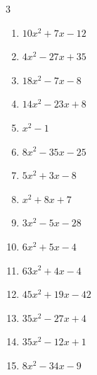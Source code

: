 \begin{multicols}{3}
\begin{enumerate}
  \item $10x^{2}+7x-12$

        \phantom{$=(5x-4)(2x+3)$}

  \item $4x^{2}-27x+35$

        \phantom{$=(4x-7)(x-5)$}

  \item $18x^{2}-7x-8$

        \phantom{$=(2x+1)(9x-8)$}

  \item $14x^{2}-23x+8$

        \phantom{$=(7x-8)(2x-1)$}

  \item $x^{2}-1$

        \phantom{$=(x-1)(x+1)$}

  \item $8x^{2}-35x-25$

        \phantom{$=(8x+5)(x-5)$}

  \item $5x^{2}+3x-8$

        \phantom{$=(5x+8)(x-1)$}

  \item $x^{2}+8x+7$

        \phantom{$=(x+7)(x+1)$}

  \item $3x^{2}-5x-28$

        \phantom{$=(x-4)(3x+7)$}

\columnbreak %

  \item $6x^{2}+5x-4$

        \phantom{$=(3x+4)(2x-1)$}

  \item $63x^{2}+4x-4$

        \phantom{$=(7x+2)(9x-2)$}

  \item $45x^{2}+19x-42$

        \phantom{$=(9x-7)(5x+6)$}

  \item $35x^{2}-27x+4$

        \phantom{$=(5x-1)(7x-4)$}

  \item $35x^{2}-12x+1$

        \phantom{$=(5x-1)(7x-1)$}

  \item $8x^{2}-34x-9$


\end{enumerate}
\end{multicols}
